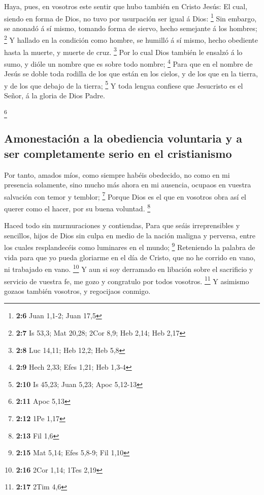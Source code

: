  Haya, pues, en vosotros este sentir que hubo también en
Cristo Jesús:  El cual, siendo en forma de Dios, no tuvo
por usurpación ser igual á Dios: \footnote{\textbf{2:6} Juan 1,1-2; Juan
  17,5}  Sin embargo, se anonadó á sí mismo, tomando forma
de siervo, hecho semejante á los hombres; \footnote{\textbf{2:7} Is
  53,3; Mat 20,28; 2Cor 8,9; Heb 2,14; Heb 2,17}  Y
hallado en la condición como hombre, se humilló á sí mismo, hecho
obediente hasta la muerte, y muerte de cruz. \footnote{\textbf{2:8} Luc
  14,11; Heb 12,2; Heb 5,8}  Por lo cual Dios también le
ensalzó á lo sumo, y dióle un nombre que es sobre todo nombre;
\footnote{\textbf{2:9} Hech 2,33; Efes 1,21; Heb 1,3-4} 
Para que en el nombre de Jesús se doble toda rodilla de los que están en
los cielos, y de los que en la tierra, y de los que debajo de la tierra;
\footnote{\textbf{2:10} Is 45,23; Juan 5,23; Apoc 5,12-13}
 Y toda lengua confiese que Jesucristo es el Señor, á la
gloria de Dios Padre.

\footnote{\textbf{2:11} Apoc 5,13}

\hypertarget{amonestaciuxf3n-a-la-obediencia-voluntaria-y-a-ser-completamente-serio-en-el-cristianismo}{%
\subsection{Amonestación a la obediencia voluntaria y a ser
completamente serio en el
cristianismo}\label{amonestaciuxf3n-a-la-obediencia-voluntaria-y-a-ser-completamente-serio-en-el-cristianismo}}

 Por tanto, amados míos, como siempre habéis obedecido,
no como en mi presencia solamente, sino mucho más ahora en mi ausencia,
ocupaos en vuestra salvación con temor y temblor; \footnote{\textbf{2:12}
  1Pe 1,17}  Porque Dios es el que en vosotros obra así
el querer como el hacer, por su buena voluntad. \footnote{\textbf{2:13}
  Fil 1,6}

 Haced todo sin murmuraciones y contiendas,
 Para que seáis irreprensibles y sencillos, hijos de Dios
sin culpa en medio de la nación maligna y perversa, entre los cuales
resplandecéis como luminares en el mundo; \footnote{\textbf{2:15} Mat
  5,14; Efes 5,8-9; Fil 1,10}  Reteniendo la palabra de
vida para que yo pueda gloriarme en el día de Cristo, que no he corrido
en vano, ni trabajado en vano. \footnote{\textbf{2:16} 2Cor 1,14; 1Tes
  2,19}  Y aun si soy derramado en libación sobre el
sacrificio y servicio de vuestra fe, me gozo y congratulo por todos
vosotros. \footnote{\textbf{2:17} 2Tim 4,6}  Y asimismo
gozaos también vosotros, y regocijaos conmigo.

